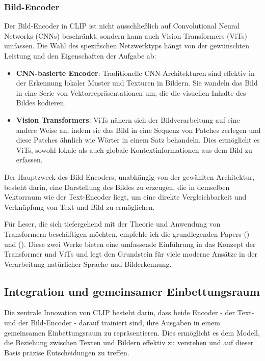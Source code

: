 \documentclass[nolibertine, ngerman, algorithm, nomencl, minted]{ttlab-qualify}
\begin{document}
\subsubsection{Bild-Encoder}
Der Bild-Encoder in CLIP ist nicht ausschließlich auf Convolutional Neural Networks (CNNs) beschränkt, sondern kann auch Vision Transformers (ViTs) umfassen. Die Wahl des spezifischen Netzwerktyps hängt von der gewünschten Leistung und den Eigenschaften der Aufgabe ab:
\begin{itemize}
    \item \textbf{CNN-basierte Encoder}: Traditionelle CNN-Architekturen sind effektiv in der Erkennung lokaler Muster und Texturen in Bildern. Sie wandeln das Bild in eine Serie von Vektorrepräsentationen um, die die visuellen Inhalte des Bildes kodieren.
    \item \textbf{Vision Transformers}: ViTs nähern sich der Bildverarbeitung auf eine andere Weise an, indem sie das Bild in eine Sequenz von Patches zerlegen und diese Patches ähnlich wie Wörter in einem Satz behandeln. Dies ermöglicht es ViTs, sowohl lokale als auch globale Kontextinformationen aus dem Bild zu erfassen.
\end{itemize}
Der Hauptzweck des Bild-Encoders, unabhängig von der gewählten Architektur, besteht darin, 
eine Darstellung des Bildes zu erzeugen, die in demselben Vektorraum wie der Text-Encoder liegt, 
um eine direkte Vergleichbarkeit und Verknüpfung von Text und Bild zu ermöglichen.

Für Leser, die sich tiefergehend mit der Theorie und Anwendung von Transformern beschäftigen möchten, 
empfehle ich die grundlegenden Papers (\cite{vaswani2017attention}) und (\cite{dosovitskiy2020image}).
Diese zwei Werke bieten eine umfassende Einführung in das Konzept der Transformer und ViTs und legt 
den Grundstein für viele moderne Ansätze in der Verarbeitung natürlicher Sprache und Bilderkennung.

\subsection{Integration und gemeinsamer Einbettungsraum}
Die zentrale Innovation von CLIP besteht darin, dass beide Encoder - der Text- und der Bild-Encoder - darauf trainiert sind, ihre Ausgaben in einem gemeinsamen Einbettungsraum zu repräsentieren. Dies ermöglicht es dem Modell, die Beziehung zwischen Texten und Bildern effektiv zu verstehen und auf dieser Basis präzise Entscheidungen zu treffen.
\end{document}
